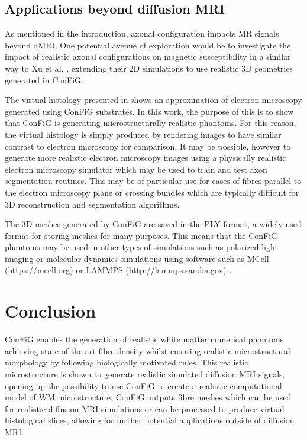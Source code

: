 \subsection*{Applications beyond diffusion MRI}
\label{sec:config_beyond_dmri}
As mentioned in the introduction, axonal configuration impacts MR signals beyond dMRI. One potential avenue of exploration would be to investigate the impact of realistic axonal configurations on magnetic susceptibility in a similar way to Xu et al. \cite{Xu2018}, extending their 2D simulations to use realistic 3D geometries generated in ConFiG.

The virtual histology presented in  shows an approximation of electron microscopy generated using ConFiG substrates. In this work, the purpose of this is to show that ConFiG is generating microstructurally realistic phantoms. For this reason, the virtual histology is simply produced by rendering images to have similar contrast to electron microscopy for comparison. It may be possible, however to generate more realistic electron microscopy images using a physically realistic electron microscopy simulator \cite{Ophus2017,Grella2003,Babin2010} which may be used to train and test axon segmentation routines. This may be of particular use for cases of fibres parallel to the electron microscopy plane or crossing bundles which are typically difficult for 3D reconstruction and segmentation algorithms.

The 3D meshes generated by ConFiG are saved in the PLY format, a widely used format for storing meshes for many purposes. This means that the ConFiG phantoms may be used in other types of simulations such as polarized light imaging \cite{Matuschke2019,Menzel2015} or molecular dynamics simulations using software such as MCell (\url{https://mcell.org}) \cite{Kerr2008a,Stiles2001,Stiles1996} or LAMMPS (\url{http://lammps.sandia.gov}) \cite{Plimpton1997}.

\section{Conclusion}
\label{sec:config_conclusion}
ConFiG enables the generation of realistic white matter numerical phantoms achieving state of the art fibre density whilst ensuring realistic microstructural morphology by following biologically motivated rules. This realistic microstructure is shown to generate realistic simulated diffusion MRI signals, opening up the possibility to use ConFiG to create a realistic computational model of WM microstructure.
ConFiG outputs fibre meshes which can be used for realistic diffusion MRI simulations or can be processed to produce virtual histological slices, allowing for further potential applications outside of diffusion MRI.


